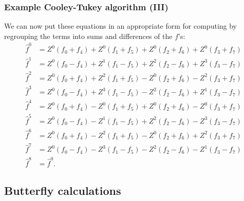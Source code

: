 \documentclass[hyperref={colorlinks=true}]{beamer}
\begin{document}
\begin{frame}%
  \frametitle{Example Cooley-Tukey algorithm (III)}
  
  We can now put these equations in an appropriate form for computing by regrouping the terms into sums and differences of the $f$'s:
  \begin{align}
    \hat{f}^{0} &= Z^{0}(f_{0} + f_{4}) + Z^{0}(f_{1} + f_{5}) + Z^{0}(f_{2} + f_{6}) + Z^{0}(f_{3} + f_{7}) \nonumber \\
    \hat{f}^{1} &= Z^{0}(f_{0} - f_{4}) + Z^{1}(f_{1} - f_{5}) + Z^{2}(f_{2} - f_{6}) + Z^{3}(f_{3} - f_{7}) \nonumber \\
    \hat{f}^{2} &= Z^{0}(f_{0} + f_{4}) + Z^{2}(f_{1} + f_{5}) - Z^{0}(f_{2} + f_{6}) - Z^{2}(f_{3} + f_{7}) \nonumber \\
    \hat{f}^{3} &= Z^{0}(f_{0} - f_{4}) + Z^{3}(f_{1} - f_{5}) - Z^{2}(f_{2} - f_{6}) + Z^{1}(f_{3} - f_{7}) \nonumber \\
    \hat{f}^{4} &= Z^{0}(f_{0} + f_{4}) - Z^{0}(f_{1} + f_{5}) + Z^{0}(f_{2} + f_{6}) - Z^{0}(f_{3} + f_{7}) \nonumber \\
    \hat{f}^{5} &= Z^{0}(f_{0} - f_{4}) - Z^{1}(f_{1} - f_{5}) + Z^{2}(f_{2} - f_{6}) - Z^{3}(f_{3} - f_{7}) \nonumber \\
    \hat{f}^{6} &= Z^{0}(f_{0} + f_{4}) - Z^{2}(f_{1} + f_{5}) - Z^{0}(f_{2} + f_{6}) + Z^{2}(f_{3} + f_{7}) \nonumber \\
    \hat{f}^{7} &= Z^{0}(f_{0} - f_{4}) - Z^{3}(f_{1} - f_{5}) - Z^{2}(f_{2} - f_{6}) - Z^{1}(f_{3} - f_{7}) \nonumber \\
    \hat{f}^{8} &= \hat{f}^{0}.
  \end{align}
  
\end{frame}  

\subsection[Butterfly calculations]{Butterfly calculations}
\end{document}
